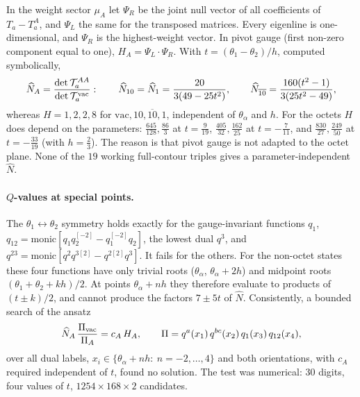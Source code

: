 \documentclass[11pt]{article}
\newcommand{\sh}[1]{^{[#1]}}
\begin{document}
In the weight sector $\mu_A$ let $\Psi_R$ be the joint null vector of all coefficients of
$T_a-T_a^A$, and $\Psi_L$ the same for the transposed matrices. Every eigenline is
one-dimensional, and $\Psi_R$ is the highest-weight vector. In pivot gauge (first non-zero
component equal to one), $H_A=\Psi_L\cdot\Psi_R$. With $t=(\theta_1-\theta_2)/h$, computed
symbolically,
\begin{equation}
\widehat N_A=\frac{\det\mathcal T_a^{AA}}{\det\mathcal T_a^{\rm vac}}:\qquad
\widehat N_{10}=\widehat N_{1}=\frac{20}{3(49-25t^2)},\qquad
\widehat N_{\overline{10}}=\frac{160(t^2-1)}{3(25t^2-49)},
\end{equation}
whereas $H=1,2,2,8$ for $\mathrm{vac},10,\overline{10},1$, independent of $\theta_\alpha$ and $h$.
For the octets $H$ does depend on the parameters: $\tfrac{645}{128},\tfrac{86}{3}$ at $t=\tfrac9{19}$,
$\tfrac{405}{32},\tfrac{162}{25}$ at $t=-\tfrac7{11}$, and $\tfrac{830}{27},\tfrac{249}{50}$ at
$t=-\tfrac{33}{19}$ (with $h=\tfrac23$). The reason is that pivot gauge is not adapted to the octet
plane. None of the $19$ working full-contour triples gives a parameter-independent $\widehat N$.

\paragraph{$Q$-values at special points.} The $\theta_1\leftrightarrow\theta_2$ symmetry holds
exactly for the gauge-invariant functions $q_1$, $q_{12}=\mathrm{monic}[q_1q_2\sh{-2}-q_1\sh{-2}q_2]$,
the lowest dual $q^3$, and $q^{23}=\mathrm{monic}[q^2q^{3[2]}-q^{2[2]}q^3]$. It fails for the others.
For the non-octet states these four functions have only trivial roots ($\theta_\alpha$,
$\theta_\alpha+2h$) and midpoint roots $(\theta_1+\theta_2+kh)/2$. At points $\theta_\alpha+nh$
they therefore evaluate to products of $(t\pm k)/2$, and cannot produce the factors $7\pm5t$ of
$\widehat N$. Consistently, a bounded search of the ansatz
\begin{equation}
\widehat N_A\,\frac{\Pi_{\rm vac}}{\Pi_A}=c_A\,H_A,\qquad
\Pi=q^{a}(x_1)\,q^{bc}(x_2)\,q_1(x_3)\,q_{12}(x_4),
\end{equation}
over all dual labels, $x_i\in\{\theta_\alpha+nh:\ n=-2,\dots,4\}$ and both orientations, with
$c_A$ required independent of $t$, found no solution. The test was numerical: 30 digits, four
values of $t$, $1254\times168\times2$ candidates.
\end{document}
